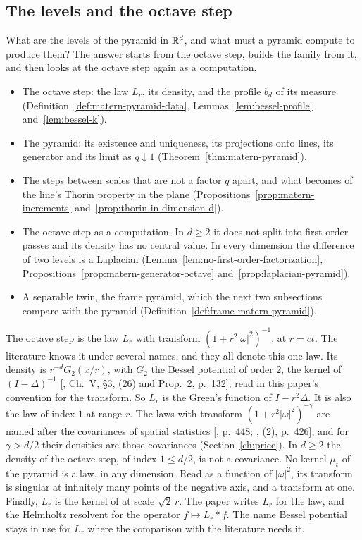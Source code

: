 \subsection{The levels and the octave step}
\label{sec:matern-levels}

What are the levels of the \Matern{} pyramid in $\mathbb{R}^d$, and what must a pyramid compute to
produce them? The answer starts from the octave step, builds the family from it, and then looks at
the octave step again as a computation.
\begin{itemize}
\item The octave step: the law $L_r$, its density, and the profile $b_d$ of its \Levy{} measure
(Definition~\ref{def:matern-pyramid-data}, Lemmas~\ref{lem:bessel-profile}
and~\ref{lem:bessel-k}).
\item The pyramid: its existence and uniqueness, its projections onto lines, its generator and its
limit as $q \downarrow 1$ (Theorem~\ref{thm:matern-pyramid}).
\item The steps between scales that are not a factor $q$ apart, and what becomes of the line's
Thorin property in the plane (Propositions~\ref{prop:matern-increments}
and~\ref{prop:thorin-in-dimension-d}).
\item The octave step as a computation. In $d \ge 2$ it does not split into first-order passes and
its density has no central value. In every dimension the difference of two levels is a Laplacian
(Lemma~\ref{lem:no-first-order-factorization}, Propositions~\ref{prop:matern-generator-octave}
and~\ref{prop:laplacian-pyramid}).
\item A separable twin, the frame \Matern{} pyramid, which the next two subsections compare with the
\Matern{} pyramid (Definition~\ref{def:frame-matern-pyramid}).
\end{itemize}

The octave step is the law $L_r$ with transform $(1 + r^2|\omega|^2)^{-1}$, at $r = ct$. The
literature knows it under several names, and they all denote this one law. Its density is
$r^{-d}G_2(x/r)$, with $G_2$ the Bessel potential of order $2$, the kernel of $(I - \Delta)^{-1}$
[, Ch.~V, \S 3, (26) and Prop.~2, p.~132], read in this paper's
convention for the transform. So $L_r$ is the Green's function of $I - r^2\Delta$. It is also the
\Matern{} law of index $1$ at range $r$. The laws with transform $(1 + r^2|\omega|^2)^{-\gamma}$ are
named after the \Matern{} covariances of spatial statistics
[, p.~448; , (2), p.~426], and for $\gamma > d/2$ their
densities are those covariances (Section~\ref{ch:price}). In $d \ge 2$ the density of the octave
step, of index $1 \le d/2$, is not a \Matern{} covariance. No kernel $\mu_t$ of the \Matern{}
pyramid is a \Matern{} law, in any dimension. Read as a function of $|\omega|^2$, its transform is
singular at infinitely many points of the negative axis, and a \Matern{} transform at one. Finally, $L_r$ is the kernel of
 at scale $\sqrt2\,r$. The paper writes $L_r$ for the law,
and the Helmholtz resolvent for the operator $f \mapsto L_r * f$. The name Bessel potential stays in
use for $L_r$ where the comparison with the literature needs it.

